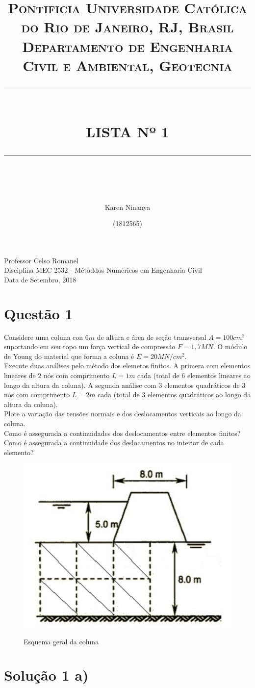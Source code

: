 \documentclass{article} %
\title{
	\normalfont \normalsize 
	\textsc{Pontificia Universidade Católica do Rio de Janeiro, RJ, Brasil \\ 
		Departamento de Engenharia Civil e Ambiental, Geotecnia} \\
	[10pt] 
	\rule{\linewidth}{0.5pt} \\[6pt] 
	\huge LISTA Nº 1\\
	\rule{\linewidth}{2pt}  \\[10pt]
}
\author{Karen Ninanya}
\date{\normalsize (1812565)}
\begin{document}
	
	\maketitle
	\noindent
	Professor \dotfill Celso Romanel\\
	Disciplina \dotfill MEC 2532 - Métoddos Numéricos em Engenharia Civil\\
	Data  de Setembro, 2018 \\
	
	\newpage
	\newpage


\section*{Questão 1}

\vspace{10mm}
Considere uma coluna con  \(6m\) de altura e área de seção transversal \(A=100cm^2\) suportando em seu topo um força vertical de compressão \(F=1,7 MN\). O módulo de Young do material  que forma a coluna é \(E=20MN/cm^2\).\\
Execute duas análises pelo método dos elemetos finitos. A primera com elementos lineares de 2 nós com comprimento \(L=1m\) cada (total de 6 elementos lineares ao longo da altura da coluna). A segunda análise com 3 elementos quadráticos de 3 nós com comprimento \(L=2m\) cada (total de 3 elementos quadráticos ao longo da altura da coluna).\\
Plote a variação das tensões normais e dos deslocamentos verticais ao longo da coluna.\\
Como é assegurada a continuidades dos deslocamentos entre elementos finitos?\\
Como é assegurada a continuidade dos deslocamentos no interior de cada elemento?
\begin{figure}[H]
	\centering
	\caption{Esquema geral da coluna}
	\includegraphics[width=0.3\linewidth]{principal}	
	\label{patton}	
\end{figure}


\newpage
\section*{Solução 1 a)}
\end{document}
